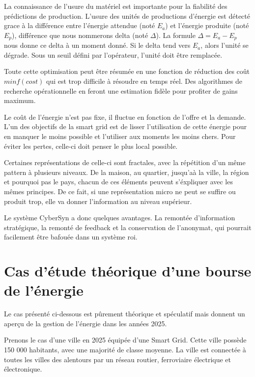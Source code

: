 La connaissance de l'usure du matériel est importante pour la fiabilité des prédictions de production.
L'usure des unités de productions d'énergie est détecté grace à la différence entre l'énergie attendue
(noté $E_a$) et l'énergie produite (noté $E_p$), différence que nous nommerons delta (noté $\Delta$).
La formule $\Delta = E_a - E_p$ nous donne ce delta à un moment donné.
Si le delta tend vers $E_a$, alors l'unité se dégrade. Sous un seuil défini par l'opérateur,
l'unité doit être remplacée.

Toute cette optimisation peut être résumée en une fonction de réduction des coût $min f(cost)$ qui est trop difficile
à résoudre en temps réel. Des algorithmes de recherche opérationnelle en feront une estimation fidèle
pour profiter de gains maximum.


Le coût de l'énergie n'est pas fixe, il fluctue en fonction de l'offre et la demande.
L'un des objectifs de la smart grid est de lisser l'utilisation de cette énergie pour
en manquer le moins possible et l'utiliser aux moments les moins chers. Pour éviter les pertes,
celle-ci doit penser le plus local possible.

Certaines représentations de celle-ci sont fractales, avec la répétition d'un même pattern à
plusieurs niveaux.
De la maison, au quartier, jusqu'aà la ville, la région et pourquoi pas le pays, chacun de
ces éléments peuvent s'éxpliquer avec les mêmes principes.
De ce fait, si une représentation micro ne peut se suffire ou produit trop, elle va donner l'information
au niveau supérieur.

Le système CyberSyn a donc quelques avantages.
La remontée d'information stratégique, la remonté de feedback et la conservation de l'anonymat,
qui pourrait facilement être bafouée dans un système roi.

\section{Cas d'étude théorique d'une bourse de l'énergie}

Le cas présenté ci-dessous est pûrement théorique et spéculatif mais donnent un aperçu de
la gestion de l'énergie dans les années 2025.

Prenons le cas d'une ville en 2025 équipée d'une Smart Grid.
Cette ville possède 150 000 habitants, avec une majorité de classe moyenne.
La ville est connectée à toutes les villes des alentours par un réseau routier, ferroviaire
électrique et électronique.

